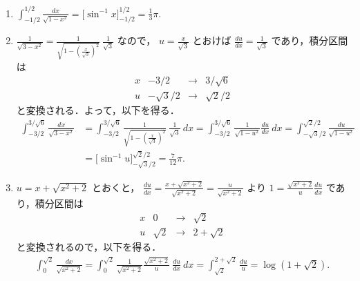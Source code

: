\documentclass[11pt, uplatex, dvipdfmx]{jsarticle}
\newcommand{\ds}{\displaystyle}
\begin{document}
\begin{enumerate}[(1)]
   \item $\ds \int_{-1/2}^{1/2} \frac{dx}{\sqrt{1-x^2}} = \Big[ \sin^{-1} x \Big]_{-1/2}^{1/2} = \frac{1}{3}\pi.$

   \item $\ds \frac{1}{\sqrt{3-x^2}}
     = \frac{1}{\sqrt{ 1-\left( \frac{x}{\sqrt{3}} \right)^2} }\ \frac{1}{\sqrt{3}} $ なので，
     $u=\frac{x}{\sqrt{3}}$ とおけば $\frac{du}{dx} = \frac{1}{\sqrt{3}}$ であり，積分区間は
     \[
       \begin{array}{c|ccc}
         x & -3/2 & \to & 3/\sqrt{6}\\ \hline
         u & -\sqrt{3}/2 & \to & \sqrt{2}/2
       \end{array}
     \]
     と変換される．よって，以下を得る．
     \[
       \begin{aligned}
         \int_{-3/2}^{3/\sqrt{6}} \frac{dx}{\sqrt{3-x^2}} &
         = \int_{-3/2}^{3/\sqrt{6}} \frac{1}{\sqrt{1- \left(\frac{x}{\sqrt{3}}\right)^2 }}\
         \frac{1}{\sqrt{3}} \ dx = \int_{-3/2}^{3/\sqrt{6}} \frac{1}{\sqrt{1-u^2}}
         \frac{du}{dx}\ dx= \int_{-\sqrt{3}/2}^{\sqrt{2}/2} \frac{du}{\sqrt{1-u^2}}\\
         &= \Big[ \sin^{-1} u \Big]_{-\sqrt{3}/2}^{\sqrt{2}/2} = \frac{7}{12}\pi.
       \end{aligned}
   \]
   \item $u=x+\sqrt{x^2+2}$ とおくと，
     $\ds \frac{du}{dx}=\frac{x+\sqrt{x^2+2}}{\sqrt{x^2+2}}=\frac{u}{\sqrt{x^2+2}}$ より
     $\ds 1 = \frac{\sqrt{x^2+2}}{u} \frac{du}{dx}$ であり，積分区間は
     \[
     \begin{array}{c|ccc}
       x & 0 & \to & \sqrt{2}\\ \hline
       u & \sqrt{2} & \to & 2+\sqrt{2}
     \end{array}
   \]
   と変換されるので，以下を得る．
     \begin{align*}
       \int_{0}^{\sqrt{2}} \frac{dx}{\sqrt{x^2+2}} 
       = \int_{0}^{\sqrt{2}} \frac{1}{\sqrt{x^2+2}} \frac{\sqrt{x^2+2}}{u}\ \frac{du}{dx} \ dx
       = \int_{\sqrt{2}}^{2+\sqrt{2}} \frac{du}{u}
       = \log \left( 1+ \sqrt{2} \right).  
     \end{align*}


\end{enumerate}
\end{document}
